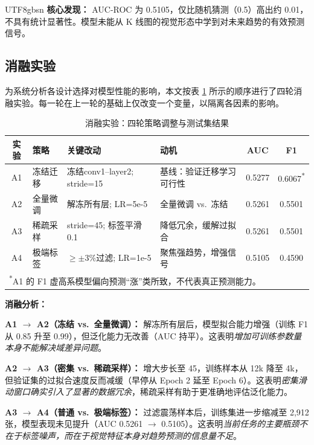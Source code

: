 \documentclass[12pt,a4paper]{article}
\begin{document}
\begin{CJK}{UTF8}{gbsn}
\textbf{核心发现：} AUC-ROC 为 0.5105，仅比随机猜测（0.5）高出约 0.01，不具有统计显著性。模型未能从 K 线图的视觉形态中学到对未来趋势的有效预测信号。

\subsection{消融实验}

为系统分析各设计选择对模型性能的影响，本文按表 \ref{tab:ablation} 所示的顺序进行了四轮消融实验。每一轮在上一轮的基础上仅改变一个变量，以隔离各因素的影响。

\begin{table}[H]
\centering
\caption{消融实验：四轮策略调整与测试集结果}
\label{tab:ablation}
\small
\begin{tabular}{clp{2.8cm}p{2.8cm}cc}
\toprule
\textbf{实验} & \textbf{策略} & \textbf{关键改动} & \textbf{动机} & \textbf{AUC} & \textbf{F1} \\
\midrule
A1 & 冻结迁移 & 冻结conv1--layer2; stride=15 & 基线：验证迁移学习可行性 & 0.5277 & 0.6067\textsuperscript{*} \\
A2 & 全量微调 & 解冻所有层; LR=5e-5 & 全量微调 vs.\ 冻结 & 0.5261 & 0.5501 \\
A3 & 稀疏采样 & stride=45; 标签平滑0.1 & 降低冗余，缓解过拟合 & 0.5261 & 0.5501 \\
A4 & 极端标签 & $\ge\pm3\%$过滤; LR=1e-5 & 聚焦强趋势，增强信号 & 0.5105 & 0.4590 \\
\bottomrule
\multicolumn{6}{l}{\footnotesize \textsuperscript{*}A1 的 F1 虚高系模型偏向预测``涨''类所致，不代表真正预测能力。} \\
\end{tabular}
\end{table}

\textbf{消融分析：}

\textbf{A1 $\to$ A2（冻结 vs.\ 全量微调）：} 解冻所有层后，模型拟合能力增强（训练 F1 从 0.85 升至 0.99），但泛化能力无改善（AUC 持平）。这表明\emph{增加可训练参数量本身不能解决域差异问题}。

\textbf{A2 $\to$ A3（密集 vs.\ 稀疏采样）：} 增大步长至 45，训练样本从 12k 降至 4k，但验证集的过拟合速度反而减缓（早停从 Epoch 2 延至 Epoch 6）。这表明\emph{密集滑动窗口确实引入了显著的数据冗余}，稀疏采样有助于更准确地评估泛化能力。

\textbf{A3 $\to$ A4（普通 vs.\ 极端标签）：} 过滤震荡样本后，训练集进一步缩减至 2,912 张，模型表现未见提升（AUC 0.5261 $\to$ 0.5105）。这表明\emph{当前任务的主要瓶颈不在于标签噪声，而在于视觉特征本身对趋势预测的信息量不足}。


\end{CJK}
\end{document}
